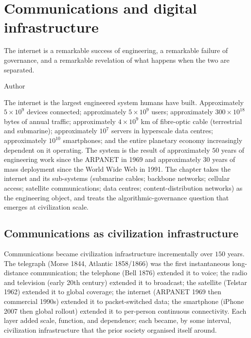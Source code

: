 \chapter{Communications and digital infrastructure}
\label{vol12:ch08}

\epigraph{The internet is a remarkable success of engineering, a remarkable failure of governance, and a remarkable revelation of what happens when the two are separated.}{Author}


\noindent
The internet is the largest engineered system humans have built. Approximately $5 \times 10^9$ devices connected; approximately $5 \times 10^9$ users; approximately $300 \times 10^{18}$ bytes of annual traffic; approximately $4 \times 10^9$ km of fibre-optic cable (terrestrial and submarine); approximately $10^7$ servers in hyperscale data centres; approximately $10^{10}$ smartphones; and the entire planetary economy increasingly dependent on it operating. The system is the result of approximately $50$ years of engineering work since the ARPANET in 1969 and approximately $30$ years of mass deployment since the World Wide Web in 1991. The chapter takes the internet and its sub-systems (submarine cables; backbone networks; cellular access; satellite communications; data centres; content-distribution networks) as the engineering object, and treats the algorithmic-governance question that emerges at civilization scale.

\section{Communications as civilization infrastructure}

Communications became civilization infrastructure incrementally over $150$ years. The telegraph (Morse 1844, Atlantic 1858/1866) was the first instantaneous long-distance communication; the telephone (Bell 1876) extended it to voice; the radio and television (early 20th century) extended it to broadcast; the satellite (Telstar 1962) extended it to global coverage; the internet (ARPANET 1969 then commercial 1990s) extended it to packet-switched data; the smartphone (iPhone 2007 then global rollout) extended it to per-person continuous connectivity. Each layer added scale, function, and dependence; each became, by some interval, civilization infrastructure that the prior society organised itself around.

